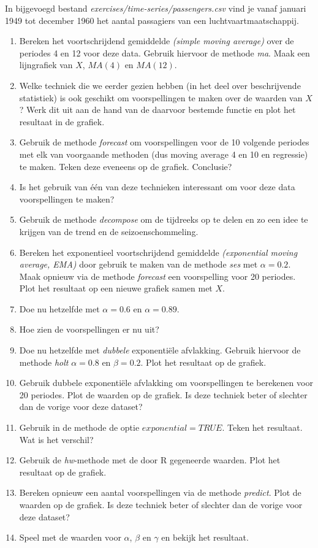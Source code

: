 \begin{exercise}
  In bijgevoegd bestand \emph{exercises/time-series/passengers.csv} vind je vanaf januari 1949 tot december 1960 het aantal passagiers van een luchtvaartmaatschappij. 
  \begin{enumerate}
    \item Bereken het voortschrijdend gemiddelde \emph{(simple moving average)} over de periodes 4 en 12 voor deze data. Gebruik hiervoor de methode \emph{ma}. Maak een lijngrafiek van $X$, $MA(4)$ en $MA(12)$.
    \item Welke techniek die we eerder gezien hebben (in het deel over beschrijvende statistiek) is ook geschikt om voorspellingen te maken over de waarden van $X$? Werk dit uit aan de hand van de daarvoor bestemde functie en plot het resultaat in de grafiek.
    \item Gebruik de methode \emph{forecast} om voorspellingen voor de 10 volgende periodes met elk van voorgaande methoden (dus moving average 4 en 10 en regressie) te maken. Teken deze eveneens op de grafiek. Conclusie?
    \item Is het gebruik van één van deze technieken interessant om voor deze data voorspellingen te maken? 
    \item Gebruik de methode \emph{decompose} om de tijdreeks op te delen en zo een idee te krijgen van de trend en de seizoenschommeling.
    \item Bereken het exponentieel voortschrijdend gemiddelde \emph{(exponential moving average, EMA)} door gebruik te maken van de methode \emph{ses} met $\alpha=0.2$. Maak opnieuw via de methode \emph{forecast} een voorspelling voor 20 periodes. Plot het resultaat op een nieuwe grafiek samen met $X$.
    \item Doe nu hetzelfde met $\alpha=0.6$ en $\alpha=0.89$. 
    \item Hoe zien de voorspellingen er nu uit?
    \item Doe nu hetzelfde met \emph{dubbele} exponentiële afvlakking. Gebruik hiervoor de methode \emph{holt}  $\alpha =  0.8$ en $\beta = 0.2$. Plot het resultaat op de grafiek.
    \item Gebruik dubbele exponentiële afvlakking om voorspellingen te berekenen voor 20 periodes. Plot de waarden op de grafiek. Is deze techniek beter of slechter dan de vorige voor deze dataset?
    \item Gebruik in de methode de optie $exponential=TRUE$. Teken het resultaat.  Wat is het verschil?
    \item Gebruik de \emph{hw}-methode met de door R gegeneerde waarden. Plot het resultaat op de grafiek.
    \item Bereken opnieuw een aantal voorspellingen via de methode \emph{predict}. Plot de waarden op de grafiek. Is deze techniek beter of slechter dan de vorige voor deze dataset?
    \item Speel met de waarden voor $\alpha$, $\beta$ en $\gamma$ en bekijk het resultaat.
  \end{enumerate}
  
\end{exercise}	